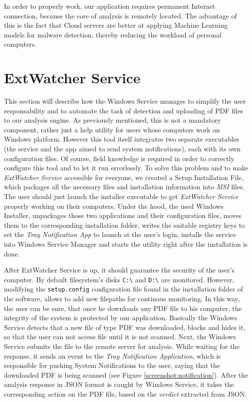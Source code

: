 In order to properly work, our application requires permanent Internet connection, because the core of analysis is remotely located. The advantage of this is the fact that Cloud servers are better at applying Machine Learning models for malware detection, thereby reducing the workload of personal computers. 


\section{ExtWatcher Service}
\label{section:winService}
This section will describe how the Windows Service manages to simplify the user responsability and to automate the task of detection and uploading of PDF files to our analysis engine. As previously mentioned, this is not a mandatory component, rather just a help utility for users whose computers work on Windows platform. However this tool itself integrates two separate executables (the service and the app aimed to send system notifications), each with its own configuration files. Of course, field knowledge is required in order to correctly configure this tool and to let it run errorlessly. To solve this problem and to make \textit{ExtWatcher Service} accessible for everyone, we created a Setup Installation File, which packages all the necessary files and installation information into \textit{MSI} files. The user should just launch the installer executable to get \textit{ExtWatcher Service} properly working on their computers. Under the hood, the used Windows Installer, unpackages those two applications and their configuration files, moves them to the corresponding installation folder, writes the suitable registry keys to set the \textit{Tray Notification App} to launch at the user's login, installs the service into Windows Service Manager and starts the utility right after the installation is done. \par
After ExtWatcher Service is up, it should guarantee the security of the user's computer. By default filesystem's disks \texttt{C:\textbackslash} and \texttt{D:\textbackslash} are monitored. However, modifying the \texttt{setup.config} configuration file found in the installation folder of the software, allows to add new filepaths for continous monitoring. In this way, the user can be sure, that once he downloads any PDF file to his computer, the integrity of the system is protected by our application. Basically the Windows Service detects that a new file of type PDF was downloaded, blocks and hides it, so that the user can not access file until it is not scanned. Next, the Windows Service submits the file to the remote server for analysis. While waiting for the response, it sends an event to the \textit{Tray Notification Application}, which is responsible for pushing System Notifications to the user, saying that the downloaded PDF is being scanned (see Figure \ref{screenshot:notification}). After the analysis response in JSON format is caught by Windows Service, it takes the corresponding action on the PDF file, based on the \textit{verdict} extracted from JSON. 

